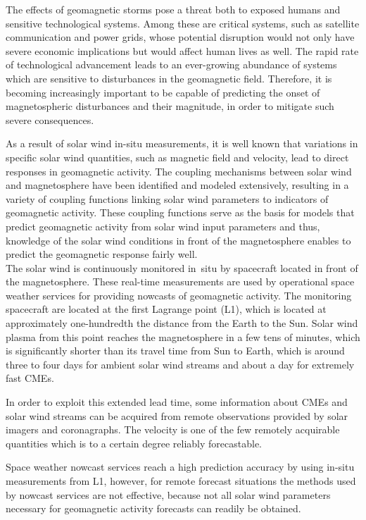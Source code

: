 The effects of geomagnetic storms pose a threat both to exposed humans and sensitive technological systems. Among these are critical systems, such as satellite communication and power grids, whose potential disruption would not only have severe economic implications but would affect human lives as well. The rapid rate of technological advancement leads to an ever-growing abundance of systems which are sensitive to disturbances in the geomagnetic field. Therefore, it is becoming increasingly important to be capable of predicting the onset of magnetospheric disturbances and their magnitude, in order to mitigate such severe consequences.

As a result of solar wind in-situ measurements, it is well known that variations in specific solar wind quantities, such as magnetic field and velocity, lead to direct responses in geomagnetic activity. The coupling mechanisms between solar wind and magnetosphere have been identified and modeled extensively, resulting in a variety of coupling functions linking solar wind parameters to indicators of geomagnetic activity. These coupling functions serve as the basis for models that predict geomagnetic activity from solar wind input parameters and thus, knowledge of the solar wind conditions in front of the magnetosphere enables to predict the geomagnetic response fairly well.\\

The solar wind is continuously monitored in~situ by spacecraft located in front of the magnetosphere. These real-time measurements are used by operational space weather services for providing nowcasts of geomagnetic activity. The monitoring spacecraft are located at the first Lagrange point (L1), which is located at approximately one-hundredth the distance from the Earth to the Sun.
Solar wind plasma from this point reaches the magnetosphere in a few tens of minutes, which is significantly shorter than its  travel time from Sun to Earth, which is around three to four days for ambient solar wind streams and about a day for extremely fast CMEs.

In order to exploit this extended lead time, some information about CMEs and solar wind streams can be acquired from remote observations provided by solar imagers and coronagraphs. The velocity is one of the few remotely acquirable quantities which is to a certain degree reliably forecastable.

Space weather nowcast services reach a high prediction accuracy by using in-situ measurements from L1, however, for remote forecast situations the methods used by nowcast services are not effective, because not all solar wind parameters necessary for geomagnetic activity forecasts can readily be obtained.\\


